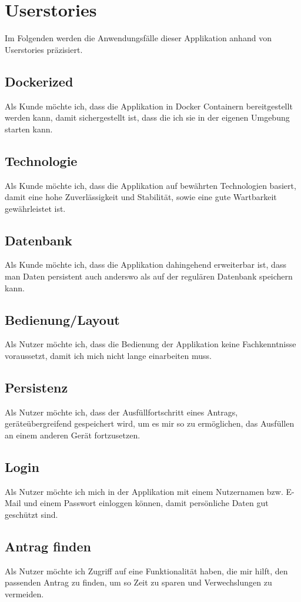 \chapter{Userstories}\label{ch:userstories}
Im Folgenden werden die Anwendungsfälle dieser Applikation anhand von Userstories präzisiert.
\section{Dockerized}
Als Kunde möchte ich, dass die Applikation in Docker Containern bereitgestellt werden kann, damit 
sichergestellt ist, dass die ich sie in der eigenen Umgebung starten kann.

\section{Technologie}
Als Kunde möchte ich, dass die Applikation auf bewährten Technologien basiert, damit eine hohe
Zuverlässigkeit und Stabilität, sowie eine gute Wartbarkeit gewährleistet ist.
\section{Datenbank}
Als Kunde möchte ich, dass die Applikation dahingehend erweiterbar ist, dass man Daten persistent 
auch anderswo als auf der regulären Datenbank speichern kann.
\section{Bedienung/Layout}
Als Nutzer möchte ich, dass die Bedienung der Applikation keine Fachkenntnisse voraussetzt, damit 
ich mich nicht lange einarbeiten muss.
\section{Persistenz}
Als Nutzer möchte ich, dass der Ausfüllfortschritt eines Antrags, geräteübergreifend gespeichert wird,
um es mir so zu ermöglichen, das Ausfüllen an einem anderen Gerät fortzusetzen.
\section{Login}
Als Nutzer möchte ich mich in der Applikation mit einem Nutzernamen bzw. E-Mail und einem Passwort
einloggen können, damit persönliche Daten gut geschützt sind.
\section{Antrag finden}
Als Nutzer möchte ich Zugriff auf eine Funktionalität haben, die mir hilft, den passenden 
Antrag zu finden, um so Zeit zu sparen und Verwechslungen zu vermeiden.
